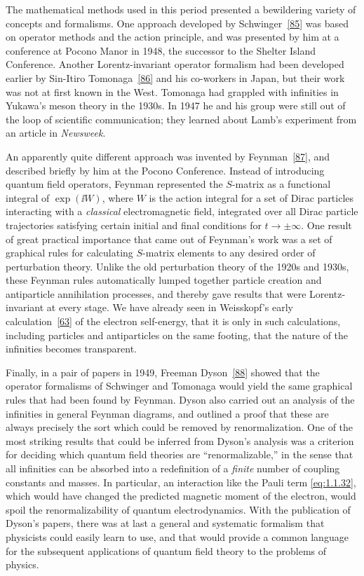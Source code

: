 The mathematical methods used in this period presented a bewildering variety of concepts and formalisms. One approach developed by Schwinger~\hyperref[ref:1.85]{[85]} was based on operator methods and the action principle, and was presented by him at a conference at Pocono Manor in 1948, the successor to the Shelter Island Conference. Another Lorentz-invariant operator formalism had been developed earlier by Sin-Itiro Tomonaga~\hyperref[ref:1.86]{[86]} and his co-workers in Japan, but their work was not at first known in the West. Tomonaga had grappled with infinities in Yukawa's meson theory in the 1930s. In 1947 he and his group were still out of the loop of scientific communication; they learned about Lamb's experiment from an article in \emph{Newsweek}.

An apparently quite different approach was invented by Feynman~\hyperref[ref:1.87]{[87]}, and described briefly by him at the Pocono Conference. Instead of introducing quantum field operators, Feynman represented the $S$-matrix as a functional integral of $\exp(\ii W)$, where $W$ is the action integral for a set of Dirac particles interacting with a \emph{classical} electromagnetic field, integrated over all Dirac particle trajectories satisfying certain initial and final conditions for $t\to\pm\infty$. One result of great practical importance that came out of Feynman's work was a set of graphical rules for calculating $S$-matrix elements to any desired order of perturbation theory. Unlike the old perturbation theory of the 1920s and 1930s, these Feynman rules automatically lumped together particle creation and antiparticle annihilation processes, and thereby gave results that were Lorentz-invariant at every stage. We have already seen in Weisskopf's early calculation~\hyperref[ref:1.63]{[63]} of the electron self-energy, that it is only in such calculations, including particles and antiparticles on the same footing, that the nature of the infinities becomes transparent.

Finally, in a pair of papers in 1949, Freeman Dyson~\hyperref[ref:1.88]{[88]} showed that the operator formalisms of Schwinger and Tomonaga would yield the same graphical rules that had been found by Feynman. Dyson also carried out an analysis of the infinities in general Feynman diagrams, and outlined a proof that these are always precisely the sort which could be removed by renormalization. One of the most striking results that could be inferred from Dyson's analysis was a criterion for deciding which quantum field theories are ``renormalizable,'' in the sense that all infinities can be absorbed into a redefinition of a \emph{finite} number of coupling constants and masses. In particular, an interaction like the Pauli term \eqref{eq:1.1.32}, which would have changed the predicted magnetic moment of the electron, would spoil the renormalizability of quantum electrodynamics. With the publication of Dyson's papers, there was at last a general and systematic formalism that physicists could easily learn to use, and that would provide a common language for the subsequent applications of quantum field theory to the problems of physics.

